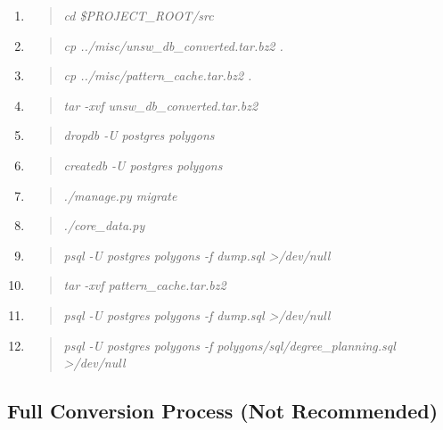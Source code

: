 \documentclass[12pt]{article}
\newenvironment{command}
   { 
      \begin{quote}\itshape
      \color{blue}
   }
   { \end{quote} }
\begin{document}
\begin{enumerate}
   \item \begin{command} cd \$PROJECT\_ROOT/src \end{command}
   \item \begin{command} cp ../misc/unsw\_db\_converted.tar.bz2 . \end{command}
   \item \begin{command} cp ../misc/pattern\_cache.tar.bz2 . \end{command}
   \item \begin{command} tar -xvf unsw\_db\_converted.tar.bz2 \end{command}
   \item \begin{command} dropdb -U postgres polygons \end{command}
   \item \begin{command} createdb -U postgres polygons \end{command}
   \item \begin{command} ./manage.py migrate \end{command}
   \item \begin{command} ./core\_data.py \end{command}
   \item \begin{command} psql -U postgres polygons -f dump.sql >/dev/null \end{command}
   \item \begin{command} tar -xvf pattern\_cache.tar.bz2 \end{command}
   \item \begin{command} psql -U postgres polygons -f dump.sql >/dev/null \end{command}
   \item \begin{command} psql -U postgres polygons -f polygons/sql/degree\_planning.sql >/dev/null \end{command}
\end{enumerate}

\subsection{Full Conversion Process (Not Recommended)}
\end{document}
